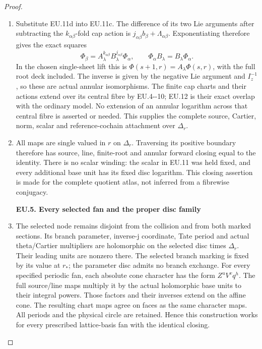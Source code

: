 \begin{proof}
\begin{enumerate}[label=\arabic*.]
\item Substitute EU.11d into EU.11c. The difference of its two Lie
arguments after subtracting the \(k_{\alpha\beta}\)-fold cap
action is \(j_{\alpha\beta}b_\beta+\Lambda_{\alpha\beta}\).
Exponentiating therefore gives the exact squares
\[
 \Phi_\beta=A_\lambda^{k_{\alpha\beta}}
                   B_\lambda^{j_{\alpha\beta}}\Phi_\alpha,
 \qquad \Phi_\alpha B_\lambda=B_\lambda\Phi_\alpha.
 \tag{EU.12}
\]
In the chosen single-sheet lift this is
\(\Phi(s+1,r)=A_\lambda\Phi(s,r)\), with the full root deck
included. The inverse is given by the negative Lie argument and
\(I_z^{-1}\), so these are actual annular isomorphisms. The finite
cap charts and their actions extend over its central fibre by
EU.4-\/-10; EU.12 is their exact overlap with the ordinary model.
No extension of an annular logarithm across that central fibre is
asserted or needed. This supplies the complete source, Cartier,
norm, scalar and reference-cochain attachment over \(\Delta_r\).

\item All maps are single valued in \(r\) on \(\Delta_r\). Traversing
its positive boundary therefore has source, line, finite-root and
annular forward closing equal to the identity. There is no scalar
winding: the scalar in EU.11 was held fixed, and every additional
base unit has its fixed disc logarithm. This closing assertion is
made for the complete quotient atlas, not inferred from a
fibrewise conjugacy.

\par

\medskip\noindent\textbf{EU.5. Every selected fan and the proper disc family}

\par\nobreak

\item The selected node remains disjoint from the collision and from both
marked sections. Its branch parameter, inverse-j coordinate, Tate
period and actual theta/Cartier multipliers are holomorphic on the
selected disc times \(\Delta_r\). Their leading units are nonzero
there. The selected branch marking is fixed by its value at \(r_*\);
the parameter disc admits no branch exchange. For every specified
periodic fan, each absolute cone character has the form
\(Z^uV^v q^h\). The full source/line maps multiply it by the actual
holomorphic base units to their integral powers. Those factors and
their inverses extend on the affine cone. The resulting chart maps
agree on faces as the same character maps. All periods and the
physical circle are retained. Hence this construction works for
every prescribed lattice-basis fan with the identical closing.


\end{enumerate}
\end{proof}
